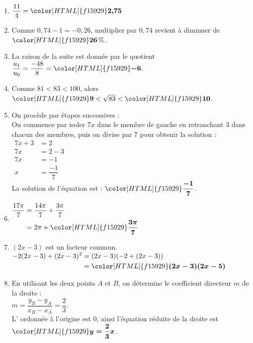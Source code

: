 \documentclass[a4paper,11pt,landscape,exos]{nsi} %
\begin{document}
\begin{multicols}{2}
\begin{enumerate}[itemsep=1em]
    \item $\dfrac{11}{4}={\color[HTML]{f15929}\boldsymbol{2{,}75}}$
    \item Comme $0{,}74-1=-0{,}26$, multiplier par $0{,}74$ revient à diminuer de ${\color[HTML]{f15929}\boldsymbol{26}}\,\%$. 
    \item La raison de la suite est donnée par le quotient $\dfrac{u_1}{u_0}=\dfrac{-48}{8}={\color[HTML]{f15929}\boldsymbol{-6}}$.
    \item Comme $81 < 83 < 100$, alors 
        ${\color[HTML]{f15929}\boldsymbol{9}} < \sqrt{83} < {\color[HTML]{f15929}\boldsymbol{10}}$.
    \item On procède par étapes successives :\\
          On commence par isoler $7x$ dans le membre de gauche en retranchant
          $3$ dans chacun des membres, puis on divise
          par $7$ pour obtenir la solution : \\
           $\begin{aligned}
           7x+3&=2\\
          7x&=2-3\\
          7x&=-1\\
          x&=\dfrac{-1}{7}    
          \end{aligned}$\\
          La solution de l'équation est : ${\color[HTML]{f15929}\boldsymbol{\dfrac{-1}{7}}}$.
          
    \item $\begin{aligned}
          \dfrac{17\pi}{7}&=\dfrac{14\pi}{7}+\dfrac{3\pi}{7}\\
          &=2\pi+{\color[HTML]{f15929}\boldsymbol{\dfrac{3\pi}{7}}}
          \end{aligned}$
    \vfill\null
    \columnbreak
    \item $(2x-3)$ est un facteur commun.\\
          $\begin{aligned}
          -2(2x-3)+(2x-3)^2
          &=(2x-3)(-2+(2x-3))\\
          &={\color[HTML]{f15929}\boldsymbol{(2x-3)(2x-5)}}\end{aligned}$
    
    \item En utilisant les deux points $A$ et $B$, on détermine le coefficient directeur $m$ de la droite : \\
        $m=\dfrac{y_B-y_A}{x_B-x_A}=\dfrac{2}{3}$.\\
             L' ordonnée à l'origine est $0$, ainsi l'équation réduite de la droite est ${\color[HTML]{f15929}\boldsymbol{y=\dfrac{2}{3}x}}$.
    

\end{enumerate}
\end{multicols}
\end{document}

